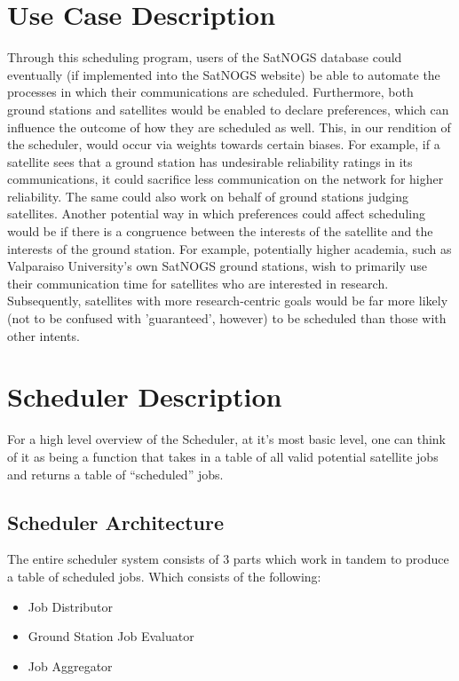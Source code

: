 \documentclass{article}
\begin{document}
\section{Use Case Description}

Through this scheduling program, users of the SatNOGS database could eventually (if implemented into the SatNOGS website) be able to automate the processes in which their communications are scheduled. Furthermore, both ground stations and satellites would be enabled to declare preferences, which can influence the outcome of how they are scheduled as well. This, in our rendition of the scheduler, would occur via weights towards certain biases. For example, if a satellite sees that a ground station has undesirable reliability ratings in its communications, it could sacrifice less communication on the network for higher reliability. The same could also work on behalf of ground stations judging satellites. Another potential way in which preferences could affect scheduling would be if there is a congruence between the interests of the satellite and the interests of the ground station. For example, potentially higher academia, such as Valparaiso University's own SatNOGS ground stations, wish to primarily use their communication time for satellites who are interested in research. Subsequently, satellites with more research-centric goals would be far more likely (not to be confused with 'guaranteed', however) to be scheduled than those with other intents.  

\section{Scheduler Description}

For a high level overview of the Scheduler, at it's most basic level, one can
think of it as being a function that takes in a table of all valid potential
satellite jobs and returns a table of ``scheduled'' jobs.

\subsection{Scheduler Architecture}

The entire scheduler system consists of 3 parts which work in tandem to produce
a table of scheduled jobs. Which consists of the following:

\begin{itemize}
\item Job Distributor
\item Ground Station Job Evaluator
\item Job Aggregator
\end{itemize}
\end{document}
